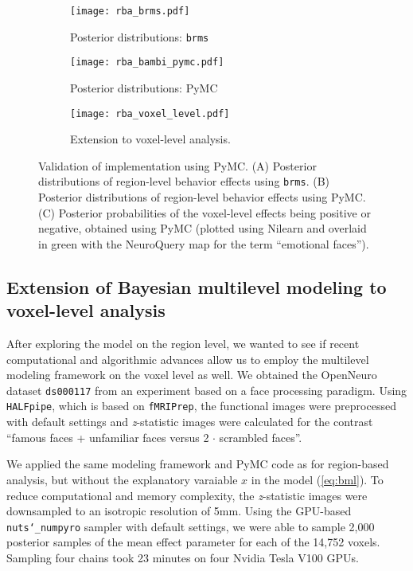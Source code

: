 \documentclass[../main.tex]{subfiles}
\begin{document}
\begin{figure}[b!]
\centering
\begin{subfigure}{.5\textwidth}
    \centering
    \caption{Posterior distributions: \texttt{brms}}
    \texttt{[image: rba\_brms.pdf]}
    \label{fig:sub1}
\end{subfigure}%
\begin{subfigure}{.5\textwidth}
    \centering
    \caption{Posterior distributions: PyMC}
    \texttt{[image: rba\_bambi\_pymc.pdf]}
    \label{fig:sub2}
\end{subfigure}
\begin{subfigure}{.9\textwidth}
    \centering
    \caption{Extension to voxel-level analysis. }
    \texttt{[image: rba\_voxel\_level.pdf]}
    \label{fig:vox}
\end{subfigure}
\caption{Validation of implementation using PyMC. (A) Posterior distributions of region-level behavior effects using \texttt{brms}. (B) Posterior distributions of region-level behavior effects using PyMC. (C) Posterior probabilities of the voxel-level effects being positive or negative, obtained using PyMC (plotted using Nilearn and overlaid in green with the NeuroQuery\cite{dockes_neuroquery_2020} map for the term ``emotional faces'').}
\label{fig:rba}
\end{figure}

\subsection{Extension of Bayesian multilevel modeling to voxel-level analysis}

After exploring the model on the region level, we wanted to see if recent computational and algorithmic advances allow us to employ the multilevel modeling framework on the voxel level as well. We obtained the OpenNeuro dataset \texttt{ds000117}\cite{wakeman_multi-subject_2015} from an experiment based on  a face processing paradigm. Using \texttt{HALFpipe}\cite{waller_enigma_2022}, which is based on \texttt{fMRIPrep}\cite{esteban_fmriprep_2019}, the functional images were preprocessed with default settings and \emph{z}-statistic images were calculated for the contrast ``famous faces + unfamiliar faces versus 2 $\cdot$ scrambled faces''. 

We applied the same modeling framework and PyMC code as for region-based analysis, but without the explanatory varaiable $x$ in the model (\ref{eq:bml}). To reduce computational and memory complexity, the \emph{z}-statistic images were downsampled to an isotropic resolution of 5mm. Using the GPU-based \texttt{nuts\char`_numpyro} sampler\cite{phan_composable_2019} with default settings, we were able to sample 2,000 posterior samples of the mean effect parameter for each of the 14,752 voxels. Sampling four chains took 23 minutes on four Nvidia Tesla V100 GPUs.
\end{document}
